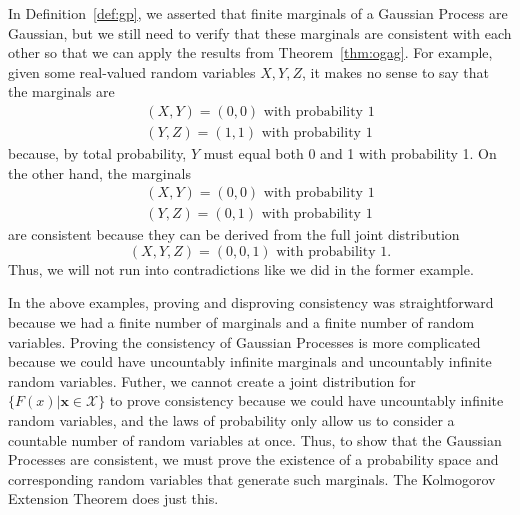 In Definition~\ref{def:gp}, we asserted that finite marginals of a Gaussian Process are Gaussian, but we still need to verify that these marginals
are consistent with each other so that we can apply the results from Theorem~\ref{thm:ogag}.
For example, given some real-valued random variables $X, Y, Z$, it makes no sense to say that the marginals are
\begin{align*}
    (X, Y) = (0, 0) \text{ with probability 1} \\
    (Y, Z) = (1, 1) \text{ with probability 1}
\end{align*}
because, by total probability, $Y$ must equal both 0 and 1 with probability 1.
On the other hand, the marginals
\begin{align*}
    (X, Y) = (0, 0) \text{ with probability 1} \\
    (Y, Z) = (0, 1) \text{ with probability 1}
\end{align*}
are consistent because they can be derived from the full joint distribution
\begin{equation*}
    (X, Y, Z) = (0, 0, 1)  \text{ with probability 1}.
\end{equation*}
Thus, we will not run into contradictions like we did in the former example.

In the above examples,
proving and disproving consistency was straightforward because we had a finite number of marginals and a finite number of random variables.
Proving the consistency of Gaussian Processes is more complicated because we could have uncountably infinite marginals and uncountably infinite random variables.
Futher, we cannot create a joint distribution for $\{ F(x) | \mathbf{x} \in \mathcal{X} \}$ to prove consistency
because we could have uncountably infinite random variables, and the laws of probability only allow us to consider a countable number of random variables at once.
Thus, to show that the Gaussian Processes are consistent,
we must prove the existence of a probability space and corresponding random variables that generate such marginals.
The Kolmogorov Extension Theorem does just this.

